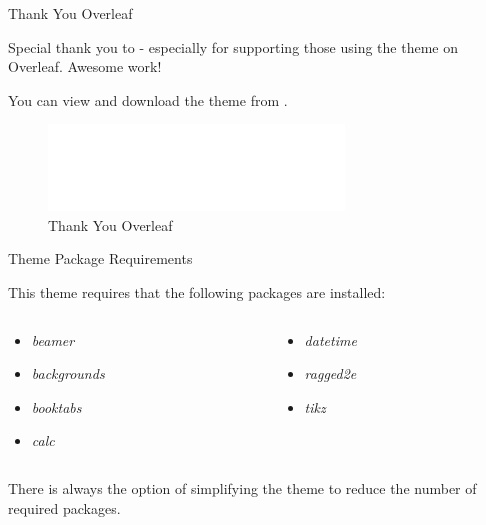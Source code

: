 \documentclass[newPxFont,numfooter,sectionpages]{beamer}
\begin{document}
\begingroup
{}
\begin{frame}{Thank You Overleaf}

Special thank you to  - especially  for supporting those using the theme on Overleaf. Awesome work!

\vspace{1em}

You can view and download the theme from .

\begin{center}
\end{center}

\begin{figure}
	\centerline{\includegraphics[width=0.7\textwidth]{overleaf.png}}
\caption{Thank You Overleaf}
\end{figure}


\end{frame}
\endgroup


\begin{frame}{Theme Package Requirements}

This theme requires that the following packages are installed:

\begin{columns}[t]
\begin{column}{0.5\textwidth}
\begin{itemize}
\item \emph{beamer}
\item \emph{backgrounds}
\item \emph{booktabs}
\item \emph{calc}
\end{itemize}
\end{column}

\begin{column}{0.5\textwidth}
\begin{itemize}
\item \emph{datetime}
\item \emph{ragged2e}
\item \emph{tikz}
\end{itemize}
\end{column}
\end{columns}
\vspace{1cm}
There is always the option of simplifying the theme to reduce the number of required packages. 

\end{frame}
\end{document}
